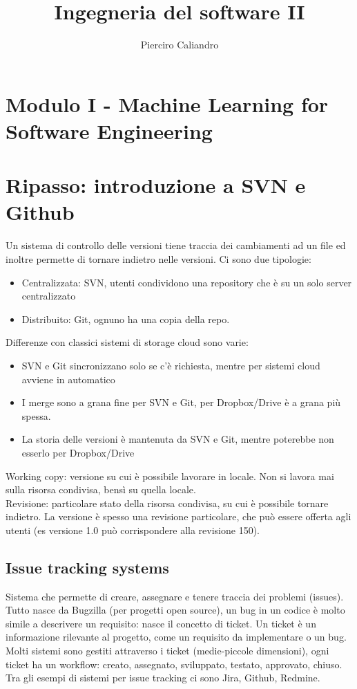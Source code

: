 \documentclass{article}
\title{Ingegneria del software II}
\author{Pierciro Caliandro}
\date{}
\begin{document}
\maketitle
\Large
\tableofcontents
\section{Modulo I - Machine Learning for Software Engineering}
\section{Ripasso: introduzione a SVN e Github}
Un sistema di controllo delle versioni tiene traccia dei cambiamenti ad un file ed inoltre permette di tornare indietro nelle versioni. Ci sono due tipologie:
\begin{itemize}
\item Centralizzata: SVN, utenti condividono una repository che è su un solo server centralizzato
\item Distribuito: Git, ognuno ha una copia della repo.
\end{itemize}
Differenze con classici sistemi di storage cloud sono varie:
\begin{itemize}
\item SVN e Git sincronizzano solo se c'è richiesta, mentre per sistemi cloud avviene in automatico
\item I merge sono a grana fine per SVN e Git, per Dropbox/Drive è a grana più spessa.
\item La storia delle versioni è mantenuta da SVN e Git, mentre poterebbe non esserlo per Dropbox/Drive
\end{itemize}
Working copy: versione su cui è possibile lavorare in locale. Non si lavora mai sulla risorsa condivisa, bensì su quella locale. \\ Revisione: particolare stato della risorsa condivisa, su cui è possibile tornare indietro. La versione è spesso una revisione particolare, che può essere offerta agli utenti (es versione 1.0 può corrispondere alla revisione 150).
\subsection{Issue tracking systems}
Sistema che permette di creare, assegnare e tenere traccia dei problemi (issues). Tutto nasce da Bugzilla (per progetti open source), un bug in un codice è molto simile a descrivere un requisito: nasce il concetto di ticket. Un ticket è un informazione rilevante al progetto, come un requisito da implementare o un bug.\\ Molti sistemi sono gestiti attraverso i ticket (medie-piccole dimensioni), ogni ticket ha un workflow: creato, assegnato, sviluppato, testato, approvato, chiuso. Tra gli esempi di sistemi per issue tracking ci sono Jira, Github, Redmine.
\end{document}
